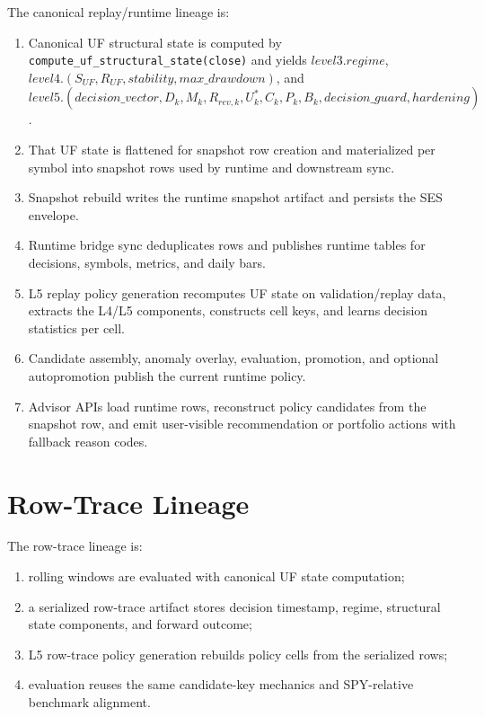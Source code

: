 \documentclass[11pt]{report}
\begin{document}
The canonical replay/runtime lineage is:
\begin{enumerate}[leftmargin=1.2cm]
    \item Canonical UF structural state is computed by \texttt{compute\_uf\_structural\_state(close)} and yields $level3.regime$, $level4.(S_{UF},R_{UF},stability,max\_drawdown)$, and $level5.(decision\_vector,D_k,M_k,R_{rev,k},U_k^{\ast},C_k,P_k,B_k,decision\_guard,hardening)$.
    \item That UF state is flattened for snapshot row creation and materialized per symbol into snapshot rows used by runtime and downstream sync.
    \item Snapshot rebuild writes the runtime snapshot artifact and persists the SES envelope.
    \item Runtime bridge sync deduplicates rows and publishes runtime tables for decisions, symbols, metrics, and daily bars.
    \item L5 replay policy generation recomputes UF state on validation/replay data, extracts the L4/L5 components, constructs cell keys, and learns decision statistics per cell.
    \item Candidate assembly, anomaly overlay, evaluation, promotion, and optional autopromotion publish the current runtime policy.
    \item Advisor APIs load runtime rows, reconstruct policy candidates from the snapshot row, and emit user-visible recommendation or portfolio actions with fallback reason codes.
\end{enumerate}

\section{Row-Trace Lineage}
The row-trace lineage is:
\begin{enumerate}[leftmargin=1.2cm]
    \item rolling windows are evaluated with canonical UF state computation;
    \item a serialized row-trace artifact stores decision timestamp, regime, structural state components, and forward outcome;
    \item L5 row-trace policy generation rebuilds policy cells from the serialized rows;
    \item evaluation reuses the same candidate-key mechanics and SPY-relative benchmark alignment.
\end{enumerate}
\end{document}
